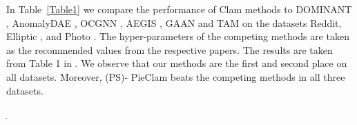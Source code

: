 \documentclass{article}
\theoremstyle{plain}
\theoremstyle{definition}
\theoremstyle{remark}
\newcommand{\dan}[1]{{{\textcolor{blue}{ {#1}\textbf{}}}}}
\begin{document}
In Table~\ref{Table1} we compare the performance of Clam methods to DOMINANT \cite{ding2019dominant}, AnomalyDAE \cite{fan2020anomalydae}, OCGNN \cite{wang2021ocgnn}, AEGIS \cite{ding2021aegis}, GAAN \cite{chen2020gaan} and TAM \cite{qiao2024tam} on the datasets Reddit, Elliptic \cite{elliptic} \cite{elliptic2}, and Photo \cite{photo}. The hyper-parameters of the competing methods are taken as the recommended values from the respective papers. The results are taken from Table 1 in \cite{qiao2024ggad}.
We observe that our methods are the first and second place on all datasets. Moreover, (PS)- PieClam beats the competing  methods in all  three datasets. %

ִ



        
\end{document}
